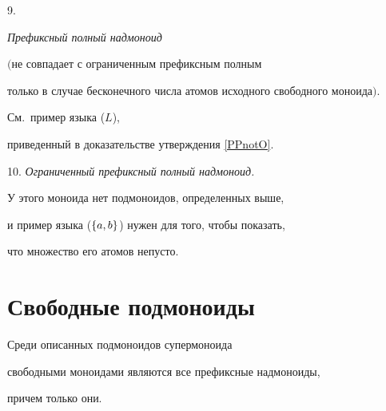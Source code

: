9. {\it Префиксный полный надмоноид


 $($не совпадает с ограниченным префиксным полным


 только в случае бесконечного числа атомов исходного свободного моноида$)$.\/}


 См.~пример языка ($L$),


 приведенный в доказательстве утверждения \ref{PPnotO}.


\medskip







\smallskip





10. {\it Ограниченный префиксный полный надмоноид.\/}


 У этого моноида нет подмоноидов, определенных выше,


 и пример языка ($\{ a,b \}$) нужен для того, чтобы показать,


 что множество его атомов непусто.











 \section{Свободные подмоноиды} \label{free}





 \begin{props} \label{Free}


 Среди описанных подмоноидов супермоноида


 свободными моноидами являются все префиксные надмоноиды,


 причем только они.


 \end{props}





